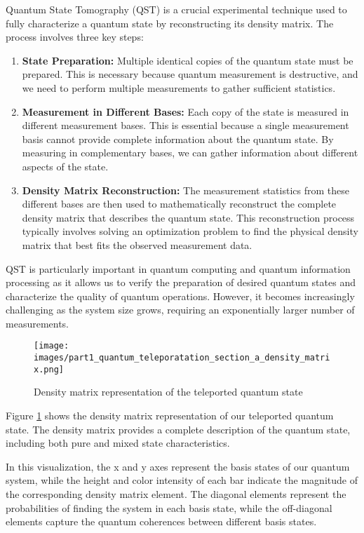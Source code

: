 \documentclass[12pt,a4paper]{article}
\begin{document}
Quantum State Tomography (QST) is a crucial experimental technique used to fully characterize a quantum state by reconstructing its density matrix. The process involves three key steps:

\begin{enumerate}
    \item \textbf{State Preparation:} Multiple identical copies of the quantum state must be prepared. This is necessary because quantum measurement is destructive, and we need to perform multiple measurements to gather sufficient statistics.
    
    \item \textbf{Measurement in Different Bases:} Each copy of the state is measured in different measurement bases. This is essential because a single measurement basis cannot provide complete information about the quantum state. By measuring in complementary bases, we can gather information about different aspects of the state.
    
    \item \textbf{Density Matrix Reconstruction:} The measurement statistics from these different bases are then used to mathematically reconstruct the complete density matrix that describes the quantum state. This reconstruction process typically involves solving an optimization problem to find the physical density matrix that best fits the observed measurement data.
\end{enumerate}

QST is particularly important in quantum computing and quantum information processing as it allows us to verify the preparation of desired quantum states and characterize the quality of quantum operations. However, it becomes increasingly challenging as the system size grows, requiring an exponentially larger number of measurements.

\begin{figure}[h]
\centering
\texttt{[image: images/part1\_quantum\_teleporatation\_section\_a\_density\_matrix.png]}
\caption{Density matrix representation of the teleported quantum state}
\label{fig:teleportation_density_matrix}
\end{figure}

Figure \ref{fig:teleportation_density_matrix} shows the density matrix representation of our teleported quantum state. The density matrix provides a complete description of the quantum state, including both pure and mixed state characteristics. 

In this visualization, the x and y axes represent the basis states of our quantum system, while the height and color intensity of each bar indicate the magnitude of the corresponding density matrix element. The diagonal elements represent the probabilities of finding the system in each basis state, while the off-diagonal elements capture the quantum coherences between different basis states.
\end{document}
